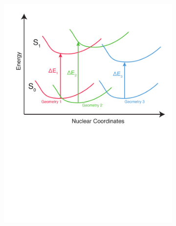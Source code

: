 \documentclass[
journal=jpcbfk, %
manuscript=article]{achemso}
\begin{document}
	\begin{figure}[!tbp]
		\centering
		\label{fig:PES}
		\begin{subfigure}[b]{0.48\textwidth}
			\includegraphics[width=1\textwidth]{images/PES1.pdf}
			\caption{}
			\label{fig:PESa)}
		\end{subfigure}
		\hfill
		\begin{subfigure}[b]{0.48\textwidth}

\end{subfigure}
\end{figure}
\end{document}
